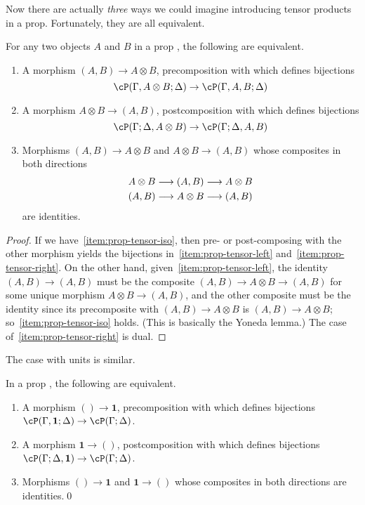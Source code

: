 \documentclass{book}
\def\one{\mathbf{1}}
\let\tensor\otimes
\begin{document}
Now there are actually \emph{three} ways we could imagine introducing tensor products in a prop.
Fortunately, they are all equivalent.

\begin{thm}\label{thm:prop-tensor}
  For any two objects $A$ and $B$ in a prop \cP, the following are equivalent.
  \begin{enumerate}
  \item A morphism $(A,B) \to A\tensor B$, precomposition with which defines bijections\label{item:prop-tensor-left}
    \[ \cP(\Gamma,A\tensor B;\Delta) \to \cP(\Gamma,A,B;\Delta) \]
  \item A morphism $A\tensor B \to (A,B)$, postcomposition with which defines bijections\label{item:prop-tensor-right}
    \[ \cP(\Gamma;\Delta,A\tensor B) \to \cP(\Gamma;\Delta,A,B) \]
  \item Morphisms $(A,B) \to A\tensor B$ and $A\tensor B \to (A,B)$ whose composites in both directions
    \begin{gather*}
      A\tensor B \too (A,B)  \too A\tensor B\\
      (A,B)\too A\tensor B \too (A,B)
    \end{gather*}
    are identities.\label{item:prop-tensor-iso}
  \end{enumerate}
\end{thm}
\begin{proof}
  If we have~\ref{item:prop-tensor-iso}, then pre- or post-composing with the other morphism yields the bijections in~\ref{item:prop-tensor-left} and~\ref{item:prop-tensor-right}.
  On the other hand, given~\ref{item:prop-tensor-left}, the identity $(A,B)\to (A,B)$ must be the composite $(A,B)\to A\tensor B \to (A,B)$ for some unique morphism $A\tensor B \to (A,B)$, and the other composite must be the identity since its precomposite with $(A,B)\to A\tensor B$ is $(A,B)\to A\tensor B$; so~\ref{item:prop-tensor-iso} holds.
  (This is basically the Yoneda lemma.)
  The case of~\ref{item:prop-tensor-right} is dual.
\end{proof}

The case with units is similar.

\begin{thm}\label{thm:prop-unit}
  In a prop \cP, the following are equivalent.
  \begin{enumerate}
  \item A morphism $()\to \one$, precomposition with which defines bijections $\cP(\Gamma,\one;\Delta) \to \cP(\Gamma;\Delta)$.
  \item A morphism $\one\to()$, postcomposition with which defines bijections $\cP(\Gamma;\Delta,\one) \to \cP(\Gamma;\Delta)$.
  \item Morphisms $()\to \one$ and $\one\to()$ whose composites in both directions are identities.\qed
  \end{enumerate}
\end{thm}
\end{document}
